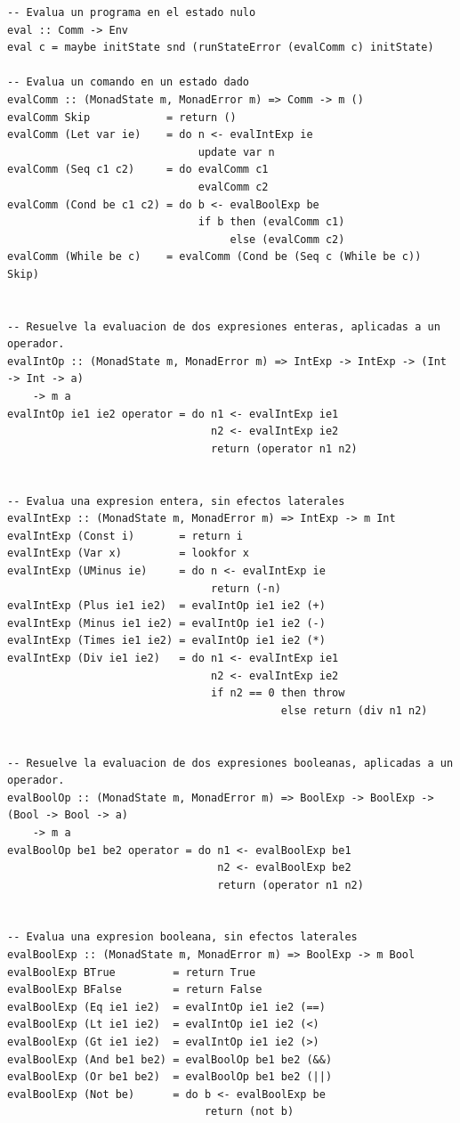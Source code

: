 \documentclass{article}
\begin{document}
\begin{lstlisting}
-- Evalua un programa en el estado nulo
eval :: Comm -> Env
eval c = maybe initState snd (runStateError (evalComm c) initState)

-- Evalua un comando en un estado dado
evalComm :: (MonadState m, MonadError m) => Comm -> m ()
evalComm Skip            = return ()
evalComm (Let var ie)    = do n <- evalIntExp ie 
                              update var n
evalComm (Seq c1 c2)     = do evalComm c1 
                              evalComm c2
evalComm (Cond be c1 c2) = do b <- evalBoolExp be 
                              if b then (evalComm c1)
                                   else (evalComm c2)
evalComm (While be c)    = evalComm (Cond be (Seq c (While be c)) Skip)


-- Resuelve la evaluacion de dos expresiones enteras, aplicadas a un operador.
evalIntOp :: (MonadState m, MonadError m) => IntExp -> IntExp -> (Int -> Int -> a) 
    -> m a
evalIntOp ie1 ie2 operator = do n1 <- evalIntExp ie1
                                n2 <- evalIntExp ie2
                                return (operator n1 n2)


-- Evalua una expresion entera, sin efectos laterales
evalIntExp :: (MonadState m, MonadError m) => IntExp -> m Int
evalIntExp (Const i)       = return i
evalIntExp (Var x)         = lookfor x
evalIntExp (UMinus ie)     = do n <- evalIntExp ie 
                                return (-n)
evalIntExp (Plus ie1 ie2)  = evalIntOp ie1 ie2 (+)
evalIntExp (Minus ie1 ie2) = evalIntOp ie1 ie2 (-)
evalIntExp (Times ie1 ie2) = evalIntOp ie1 ie2 (*)
evalIntExp (Div ie1 ie2)   = do n1 <- evalIntExp ie1
                                n2 <- evalIntExp ie2
                                if n2 == 0 then throw
                                           else return (div n1 n2)


-- Resuelve la evaluacion de dos expresiones booleanas, aplicadas a un operador.
evalBoolOp :: (MonadState m, MonadError m) => BoolExp -> BoolExp -> (Bool -> Bool -> a)
    -> m a
evalBoolOp be1 be2 operator = do n1 <- evalBoolExp be1
                                 n2 <- evalBoolExp be2
                                 return (operator n1 n2)
                                 
                                 
-- Evalua una expresion booleana, sin efectos laterales
evalBoolExp :: (MonadState m, MonadError m) => BoolExp -> m Bool
evalBoolExp BTrue         = return True
evalBoolExp BFalse        = return False
evalBoolExp (Eq ie1 ie2)  = evalIntOp ie1 ie2 (==)
evalBoolExp (Lt ie1 ie2)  = evalIntOp ie1 ie2 (<)
evalBoolExp (Gt ie1 ie2)  = evalIntOp ie1 ie2 (>)
evalBoolExp (And be1 be2) = evalBoolOp be1 be2 (&&)
evalBoolExp (Or be1 be2)  = evalBoolOp be1 be2 (||)
evalBoolExp (Not be)      = do b <- evalBoolExp be
                               return (not b)

\end{lstlisting}
\end{document}
